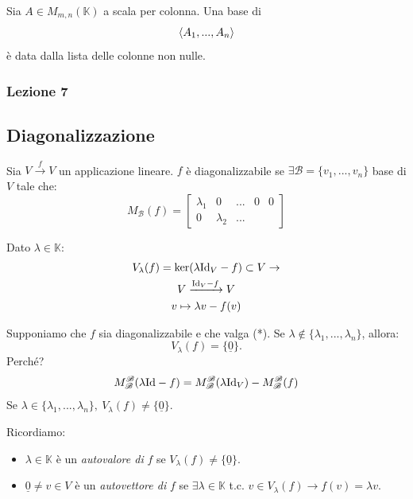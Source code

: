 \begin{proprieta}
    Sia $A\in M_{m, n}(\mathbb{K})$ a scala per colonna. Una base di
    \begin{equation}
        \left\langle{A_1,...,A_n}\right\rangle
    \end{equation}
    è data dalla lista delle colonne non nulle.
\end{proprieta}

\subsubsection{Lezione 7}
\subsection{Diagonalizzazione}
Sia $V \xrightarrow{f} V$ un applicazione lineare. $f$ è diagonalizzabile se $\exists \mathscr{B} = \{v_1,...,v_n\}$ base di $V$ tale che:
\begin{equation}
    M_{\mathscr{B}}(f) = \begin{bmatrix}
        \lambda_1 & 0 & ... & 0 & 0 \\
        0  & \lambda_2 & ...
    \end{bmatrix}
\end{equation}

Dato $\lambda \in \mathbb{K}$:
\begin{gather}
    V_{\lambda}(f) = \ker (\lambda \text{Id}_V - f) \subset V \rightarrow \\
    V \xrightarrow{\text{Id}_V - f} V \\
    v \mapsto \lambda v-f(v)
\end{gather}
\begin{esempio}
    Supponiamo che $f$ sia diagonalizzabile e che valga (*). Se $\lambda \not \in \{\lambda_1,...,\lambda_n\}$, allora:
    \begin{equation}
        V_\lambda (f) = \{\underline{0}\}.
    \end{equation}
    Perché?
    \begin{equation}
        M_{\mathscr{B}}^{\mathscr{B}} (\lambda \text{Id} - f) = M^{\mathscr{B}}_{\mathscr{B}}( \lambda \text{Id}_V ) - M^{\mathscr{B}}_{\mathscr{B}}(f)
    \end{equation}
    Se $\lambda \in \{\lambda_1,...,\lambda_n\},\ V_{\lambda}(f)\not=\{\underline{0}\}$. 
\end{esempio}
Ricordiamo:
\begin{itemize}
    \item $\lambda\in \mathbb{K}$ è un \textit{autovalore di} $f$ se $V_{\lambda}(f)\not=\{\underline{0}\}.$
    \item $\underline{0}\not= v\in V$ è un \textit{autovettore di} $f$ se $\exists \lambda\in \mathbb{K}$ t.c. $v\in V_{\lambda}(f) \rightarrow f(v)=\lambda v$.
\end{itemize}


